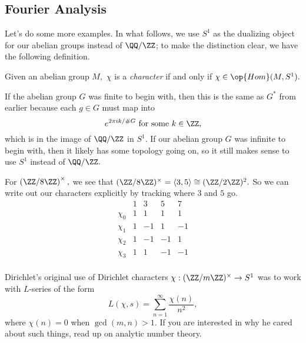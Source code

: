 \subsection{Fourier Analysis}
Let's do some more examples. In what follows, we use $S^1$ as the dualizing object for our abelian groups instead of $\QQ/\ZZ$; to make the distinction clear, we have the following definition.
\begin{defi}[Character]
	Given an abelian group $M,$ $\chi$ is a \textit{character} if and only if $\chi\in\op{Hom}(M,S^1).$
\end{defi}
If the abelian group $G$ was finite to begin with, then this is the same as $G^*$ from earlier because each $g\in G$ must map into
\[e^{2\pi ik/\#G}\text{ for some }k\in\ZZ,\]
which is in the image of $\QQ/\ZZ$ in $S^1.$ If our abelian group $G$ was infinite to begin with, then it likely has some topology going on, so it still makes sense to use $S^1$ instead of $\QQ/\ZZ.$
\begin{example}
	For $\left(\ZZ/8\ZZ\right)^\times,$ we see that $(\ZZ/8\ZZ)^\times=\langle3,5\rangle\cong(\ZZ/2\ZZ)^2.$ So we can write out our characters explicitly by tracking where $3$ and $5$ go.
	\[\begin{array}{c|cccc}
		 & 1 & 3 & 5 & 7 \\\hline
		\chi_0 & 1 & 1 & 1 & 1 \\
		\chi_1 & 1 & -1 & 1 & -1 \\
		\chi_2 & 1 & -1 & -1 & 1 \\
		\chi_3 & 1 & 1 & -1 & -1 \\
	\end{array}\]
\end{example}
\begin{remark}
	Dirichlet's original use of Dirichlet characters $\chi:(\ZZ/m\ZZ)^\times\to S^1$ was to work with $L$-series of the form
	\[L(\chi,s)=\sum_{n=1}^\infty\frac{\chi(n)}{n^2},\]
	where $\chi(n)=0$ when $\gcd(m,n)>1.$ If you are interested in why he cared about such things, read up on analytic number theory.
\end{remark}

